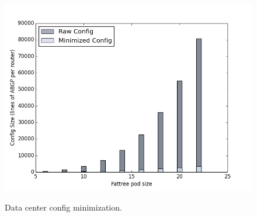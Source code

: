 \begin{figure}[t!]
\centering
\includegraphics[width=\columnwidth]{figures/config-compression-dc.png}
\label{fig:compilation-compression-dc}
\caption{Data center config minimization.}
\end{figure}
